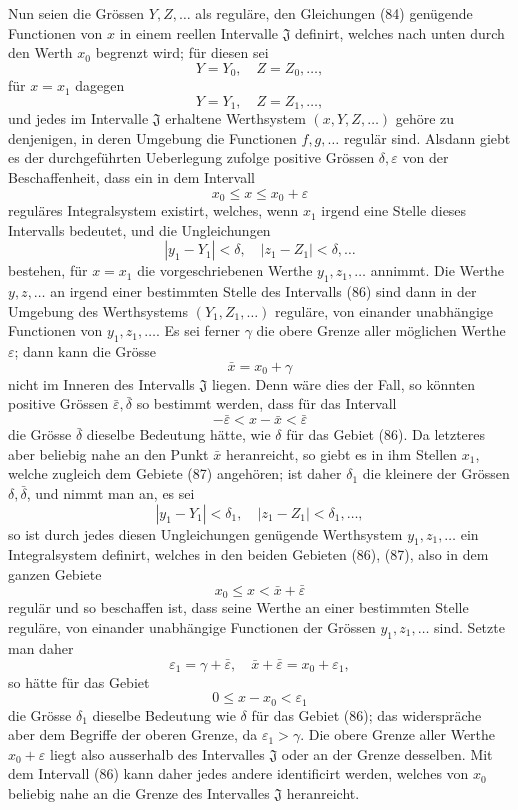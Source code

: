 \documentclass[11pt,a4paper,leqno]{article}
\begin{document}
Nun seien die Grössen $Y,Z,\ldots$ als reguläre, den Gleichungen (84) genügende Functionen von $x$ in einem reellen Intervalle $\mathfrak J$ definirt, welches nach unten durch den Werth $x_0$ begrenzt wird; für diesen sei
\[
Y=Y_0,\quad Z=Z_0,\ldots,
\]
für $x=x_1$ dagegen
\[
Y=Y_1,\quad Z=Z_1,\ldots,
\]
und jedes im Intervalle $\mathfrak J$ erhaltene Werthsystem $(x,Y,Z,\ldots)$ gehöre zu denjenigen, in deren Umgebung die Functionen $f,g,\ldots$
regulär sind. Alsdann giebt es der durchgeführten Ueberlegung zufolge positive Grössen $\delta,\varepsilon$ von der Beschaffenheit, dass ein in dem Intervall
\begin{equation}\tag{86}
x_0\leq x\leq x_0+\varepsilon
\end{equation}
reguläres Integralsystem existirt, welches, wenn $x_1$ irgend eine Stelle dieses Intervalls bedeutet, und die Ungleichungen
\[
|y_1-Y_1|<\delta,\quad |z_1-Z_1|<\delta,\ldots
\]
bestehen, für $x=x_1$ die vorgeschriebenen Werthe $y_1,z_1,\ldots$ annimmt. Die Werthe $y,z,\ldots$ an irgend einer bestimmten Stelle des Intervalls (86) sind dann in der Umgebung des Werthsystems $(Y_1,Z_1,\ldots)$ reguläre, von einander unabhängige Functionen von $y_1,z_1,\ldots$. Es sei ferner $\gamma$ die obere Grenze aller möglichen Werthe $\varepsilon$; dann kann die Grösse
\[
\bar x=x_0+\gamma
\]
nicht im Inneren des Intervalls $\mathfrak J$ liegen. Denn wäre dies der Fall, so könnten positive Grössen $\bar\varepsilon,\bar\delta$ so bestimmt werden, dass für das Intervall
\begin{equation}\tag{87}
-\bar\varepsilon<x-\bar x<\bar\varepsilon
\end{equation}
die Grösse $\bar\delta$ dieselbe Bedeutung hätte, wie $\delta$ für das Gebiet (86). Da letzteres aber beliebig nahe an den Punkt $\bar x$ heranreicht, so giebt es in ihm Stellen $x_1$, welche zugleich dem Gebiete (87) angehören; ist daher $\delta_1$ die kleinere der Grössen $\delta,\bar\delta$, und nimmt man an, es sei
\[
|y_1-Y_1|<\delta_1,\quad |z_1-Z_1|<\delta_1,\ldots,
\]
so ist durch jedes diesen Ungleichungen genügende Werthsystem $y_1,z_1,\ldots$ ein Integralsystem definirt, welches in den beiden Gebieten (86), (87), also in dem ganzen Gebiete
\[
x_0\leq x<\bar x+\bar\varepsilon
\]
regulär und so beschaffen ist, dass seine Werthe an einer bestimmten Stelle reguläre, von einander unabhängige Functionen der Grössen $y_1,z_1,\ldots$ sind. Setzte man daher
\[
\varepsilon_1=\gamma+\bar\varepsilon,\quad \bar x+\bar\varepsilon=x_0+\varepsilon_1,
\]
so hätte für das Gebiet
\[
0\leq x-x_0<\varepsilon_1
\]
die Grösse $\delta_1$ dieselbe Bedeutung wie $\delta$ für das Gebiet (86); das widerspräche aber dem Begriffe der oberen Grenze, da $\varepsilon_1>\gamma$. Die obere Grenze aller Werthe $x_0+\varepsilon$ liegt also ausserhalb des
Intervalles $\mathfrak J$ oder an der Grenze desselben. Mit dem Intervall (86) kann daher jedes andere identificirt werden, welches von $x_0$ beliebig nahe an die Grenze des Intervalles $\mathfrak J$ heranreicht.
\end{document}
